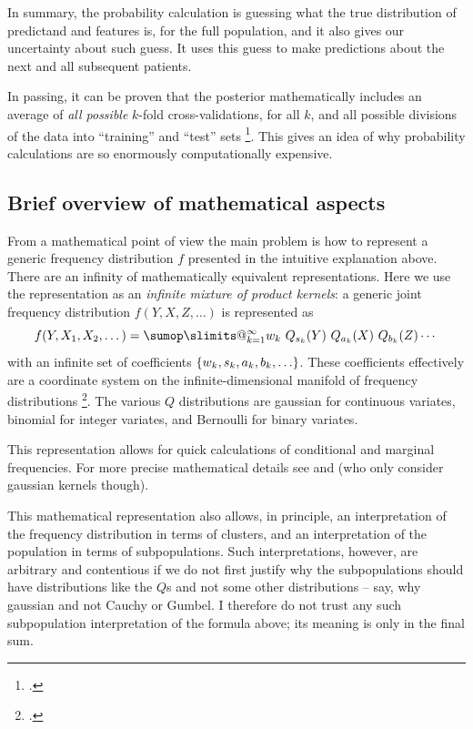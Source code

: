 \documentclass[\ifafour a4paper,12pt,\else a5paper,10pt,\fi%
onecolumn,oneside,article,%
british%
]{memoir}
\makeatletter
\theoremstyle{remark}
\theoremstyle{innote}
\def\sum{\DOTSI\sumop\slimits@}
\newcommand*{\citep}{\footcites}
\DeclarePairedDelimiter\set{\{}{\}} %
\renewcommand*{\|}[1][]{\nonscript\:#1\vert\nonscript\:\mathopen{}}
\makeatother
\begin{document}
In summary, the probability calculation is guessing what the true
distribution of predictand and features is, for the full population, and it
also gives our uncertainty about such guess. It uses this guess to make
predictions about the next and all subsequent patients.

In passing, it can be proven that the posterior mathematically includes an
average of \emph{all possible} $k$-fold cross-validations, for all $k$, and
all possible divisions of the data into \enquote{training} and
\enquote{test} sets \citep{portamana2019b}. This gives an idea of why
probability calculations are so enormously computationally expensive.

\subsection{Brief overview of mathematical aspects}
\label{sec:maths}

From a mathematical point of view the main problem is how to represent a
generic frequency distribution $f$ presented in the intuitive explanation
above. There are an infinity of mathematically equivalent representations.
Here we use the representation as an \emph{infinite mixture of product
  kernels}: a generic joint frequency distribution $f(Y, X, Z, \dotsc)$ is
represented as
\begin{equation}
  \label{eq:freq_repr}
  f(Y, X_{1}, X_{2}, \dotsc) =
  \sum_{k=1}^{\infty} w_{k}\ Q_{s_{k}}(Y)\ Q_{a_{k}}(X)\ Q_{b_{k}}(Z) \dotsm
\end{equation}
with an infinite set of coefficients
$\set{w_{k},s_{k},a_{k},b_{k},\dotsc}$. These coefficients effectively are
a coordinate system on the infinite-dimensional manifold of frequency
distributions \citep[esp.\ Part~VII]{choquetbruhatetal1977_r1996}. The
various $Q$ distributions are gaussian for continuous variates, binomial
for integer variates, and Bernoulli for binary variates.

This representation allows for quick calculations of conditional and
marginal frequencies. For more precise mathematical details see
\textcite{dunsonetal2011} and \textcite{rasmussen1999} (who only consider
gaussian kernels though).

This mathematical representation also allows, in principle, an
interpretation of the frequency distribution in terms of clusters, and an
interpretation of the population in terms of subpopulations. Such
interpretations, however, are arbitrary and contentious if we do not first
justify why the subpopulations should have distributions like the $Q$s and
not some other distributions -- say, why gaussian and not Cauchy or Gumbel.
I therefore do not trust any such subpopulation interpretation of the
formula above; its meaning is only in the final sum.
\end{document}
